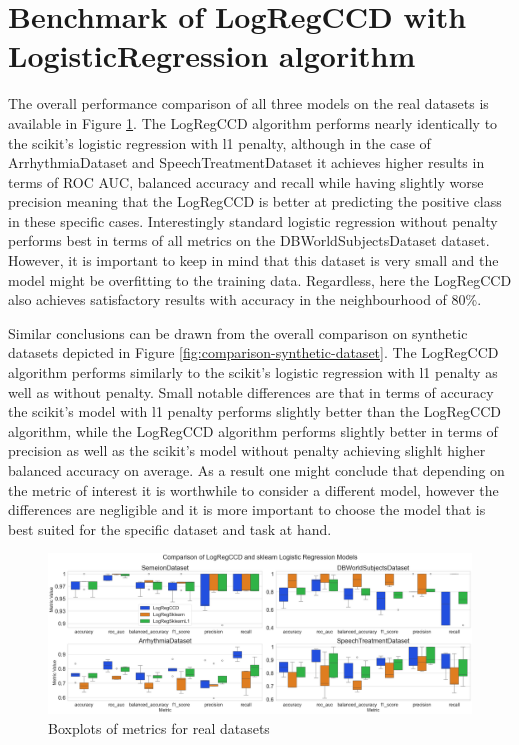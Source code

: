\documentclass[11pt]{article}
\begin{document}
\section{Benchmark of LogRegCCD with LogisticRegression algorithm}

The overall performance comparison of all three models on the real datasets is available in Figure \ref{fig:real-data-boxplots}. The LogRegCCD algorithm performs nearly identically to the scikit's logistic regression with l1 penalty, although in the case of ArrhythmiaDataset and SpeechTreatmentDataset it achieves higher results in terms of ROC AUC, balanced accuracy and recall while having slightly worse precision meaning that the LogRegCCD is better at predicting the positive class in these specific cases. Interestingly standard logistic regression without penalty performs best in terms of all metrics on the DBWorldSubjectsDataset dataset. However, it is important to keep in mind that this dataset is very small and the model might be overfitting to the training data. Regardless, here the LogRegCCD also achieves satisfactory results with accuracy in the neighbourhood of 80\%. \par

Similar conclusions can be drawn from the overall comparison on synthetic datasets depicted in Figure \ref{fig:comparison-synthetic-dataset}. The LogRegCCD algorithm performs similarly to the scikit's logistic regression with l1 penalty as well as without penalty. Small notable differences are that in terms of accuracy the scikit's model with l1 penalty performs slightly better than the LogRegCCD algorithm, while the LogRegCCD algorithm performs slightly better in terms of precision as well as the scikit's model without penalty achieving slighlt higher balanced accuracy on average. As a result one might conclude that depending on the metric of interest it is worthwhile to consider a different model, however the differences are negligible and it is more important to choose the model that is best suited for the specific dataset and task at hand. \par


\begin{figure}[h]
    \centering
  \includegraphics[width=\textwidth]{../results/real_data_boxplots.png}
    \caption{Boxplots of metrics for real datasets}
    \label{fig:real-data-boxplots}
  \end{figure}
\end{document}
